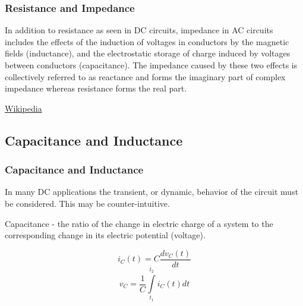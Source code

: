 \documentclass[fleqn]{beamer} %
\newcommand{\sectionIsubsectionIItitle}{Resistance and Impedance}
\newcommand{\sectionIsubsectionIIItitle}{Capacitance and Inductance}
\begin{document}
			\begin{frame}
				\frametitle{\sectionIsubsectionIItitle}

					In addition to {\PR resistance} as seen in DC circuits, {\PN impedance} in AC circuits includes the effects of the induction of voltages in conductors by the magnetic fields (inductance), and the electrostatic storage of charge induced by voltages between conductors (capacitance). The impedance caused by these two effects is collectively referred to as reactance and forms the imaginary part of complex impedance whereas resistance forms the real part. 

{\tiny \href{https://en.wikipedia.org/wiki/Electrical_impedance}{Wikipedia}}

	

			\end{frame}


			\begin{frame}

						\bigskip  
			


			\end{frame}

			\begin{frame}




		
			\end{frame}





		\subsection{\sectionIsubsectionIIItitle}\label{sectionIsubsectionIII}
			\begin{frame} 
				\frametitle{\sectionIsubsectionIIItitle}

				\bigskip

					In many DC applications the transient, or dynamic, behavior of the circuit must be considered. This may be counter-intuitive. \vspc
	
		{\PR Capacitance} - the ratio of the change in electric charge of a system to the corresponding change in its electric potential (voltage). \vspc

	\begin{fleqn}
		\[i_C(t)=C\frac{dv_C\left(t\right)}{dt} \] \vspace{2mm}
		\[v_C=\frac{1}{C}\int\limits_{t_1}^{t_2}i_C(t)dt \]
	\end{fleqn}







			\end{frame}	
\end{document}
